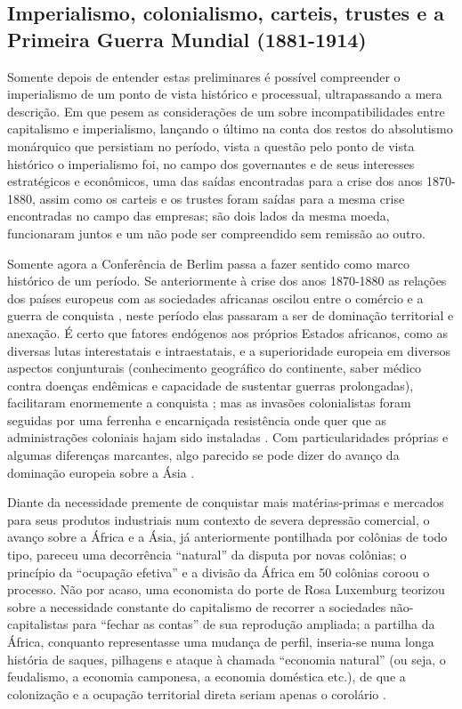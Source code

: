 \subsection{Imperialismo, colonialismo, carteis, trustes e a Primeira Guerra Mundial (1881-1914)} \label{sec:impercol}

Somente depois de entender estas preliminares é possível compreender o imperialismo de um ponto de vista histórico e processual, ultrapassando a mera descrição. Em que pesem as considerações de um  sobre incompatibilidades entre capitalismo e imperialismo, lançando o último na conta dos restos do absolutismo monárquico que persistiam no período, vista a questão pelo ponto de vista histórico o imperialismo foi, no campo dos governantes e de seus interesses estratégicos e econômicos, uma das saídas encontradas para a crise dos anos 1870-1880, assim como os carteis e os trustes foram saídas para a mesma crise encontradas no campo das empresas; são dois lados da mesma moeda, funcionaram juntos e um não pode ser compreendido sem remissão ao outro.

Somente agora a Conferência de Berlim passa a fazer sentido como marco histórico de um período. Se anteriormente à crise dos anos 1870-1880 as relações dos países europeus com as sociedades africanas oscilou entre o comércio e a guerra de conquista \cite{ogot_hisaf5_2010,AJAYI2010}, neste período elas passaram a ser de dominação territorial e anexação. É certo que fatores endógenos aos próprios Estados africanos, como as diversas lutas interestatais e intraestatais, e a superioridade europeia em diversos aspectos conjunturais (conhecimento geográfico do continente, saber médico contra doenças endêmicas e capacidade de sustentar guerras prolongadas), facilitaram enormemente a conquista \cite{uzoigwe_partilha_2010}; mas as invasões colonialistas foram seguidas por uma ferrenha e encarniçada resistência onde quer que as administrações coloniais hajam sido instaladas \cite[p.~51-318]{boahen_hisaf7_2010}. Com particularidades próprias e algumas diferenças marcantes, algo parecido se pode dizer do avanço da dominação europeia sobre a Ásia \cite{panikkar_domasia_1977}. 

Diante da necessidade premente de conquistar mais matérias-primas e mercados para seus produtos industriais num contexto de severa depressão comercial, o avanço sobre a África e a Ásia, já anteriormente pontilhada por colônias de todo tipo, pareceu uma decorrência ``natural'' da disputa por novas colônias; o princípio da ``ocupação efetiva'' e a divisão da África em 50 colônias coroou o processo. Não por acaso, uma economista do porte de Rosa Luxemburg teorizou sobre a necessidade constante do capitalismo de recorrer a sociedades não-capitalistas para ``fechar as contas'' de sua reprodução ampliada; a partilha da África, conquanto representasse uma mudança de perfil, inseria-se numa longa história de saques, pilhagens e ataque à chamada ``economia natural'' (ou seja, o feudalismo, a economia camponesa, a economia doméstica etc.), de que a colonização e a ocupação territorial direta seriam apenas o corolário \cite{luxemburg_acumula_1985}.

